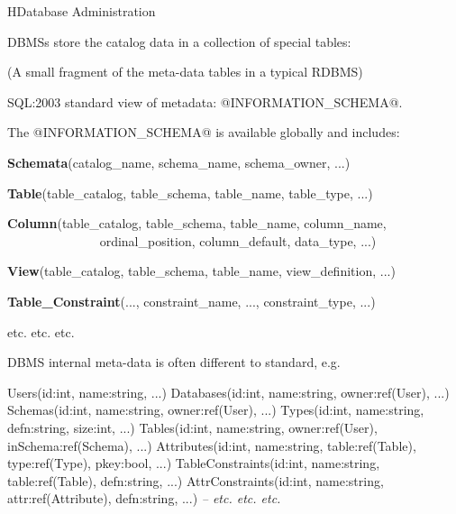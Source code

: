\begin{lecture}{H}{Database Administration}
\begin{slide}
DBMSs store the catalog data in a collection of special tables:

\vspace*{1cm}\begin{center}\end{center}

{\small (A small fragment of the meta-data tables in a typical RDBMS)}
\end{slide}

\begin{slide}
SQL:2003 standard view of metadata: @INFORMATION_SCHEMA@.

The @INFORMATION_SCHEMA@ is available globally and includes:

{\bf{Schemata}}(catalog\_name, schema\_name, schema\_owner, ...)

{\bf{Table}}(table\_catalog, table\_schema, table\_name, table\_type, ...)

{\bf{Column}}(table\_catalog, table\_schema, table\_name, column\_name, \\
~~~ ~~~ ~~~ ~~~ ordinal\_position, column\_default, data\_type, ...)

{\bf{View}}(table\_catalog, table\_schema, table\_name, view\_definition, ...)

{\bf{Table\_Constraint}}(..., constraint\_name, ..., constraint\_type, ...)

{\small etc. etc. etc.}
\end{slide}

\begin{slide}
DBMS internal meta-data is often different to standard, e.g.
\begin{indent}
\begin{small}
\begin{session}
    Users(id:int, name:string, ...)
    Databases(id:int, name:string, owner:ref(User), ...)
    Schemas(id:int, name:string, owner:ref(User), ...)
    Types(id:int, name:string, defn:string, size:int, ...)
    Tables(id:int, name:string, owner:ref(User),
                                    inSchema:ref(Schema), ...)
    Attributes(id:int, name:string, table:ref(Table),
                               type:ref(Type), pkey:bool, ...)
    TableConstraints(id:int, name:string, table:ref(Table),
                                             defn:string, ...)
    AttrConstraints(id:int, name:string, attr:ref(Attribute),
                                             defn:string, ...)
    {\textit{-- etc. etc. etc.}}
\end{session}
\end{small}
\end{indent}
\end{slide}


\end{lecture}
